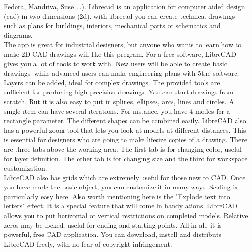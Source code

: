 Fedora,  Mandriva,  Suse  ...).  Librecad  is  an  application  for  computer  aided  design  (cad)  in  two
dimensions  (2d).  with  librecad   you   can  create  technical  drawings  such  as  plans  for  buildings,  interiors,
mechanical parts or schematics and diagrams.\\
The  app  is  great  for  industrial  designers,  but  anyone  who  wants  to  learn  how  to  make  2D  CAD
drawings  will  like  this  program.  For  a  free  software,  LibreCAD  gives  you  a  lot  of  tools  to  work  with.
New  users  will  be  able  to  create  basic drawings, while advanced users can make engineering plans with
5the  software.  Layers  can  be  added,  ideal  for  complex   drawings.  The  provided  tools  are  sufficient  for
producing  high  precision  drawings.  You  can  start  drawings  from  scratch.  But  it  is  also  easy  to  put  in
splines,  ellipses,  arcs,  lines  and   circles.  A  single  item  can  have  several iterations. For instance, you have
4 modes for a rectangle parameter. The different shapes can be combined easily.
LibreCAD  also  has  a  powerful  zoom  tool  that  lets  you  look  at  models  at  different  distances.  This  is
essential  for  designers  who  are  going  to  make  life­size  copies  of  a  drawing.  There are three tabs above
the  working  area.   The  first  tab  is  for  changing  color,  useful  for  layer  definition.   The  other  tab  is  for
changing size and the third for workspace customization.\\
  LibreCAD also has grids which are extremely useful for those new to CAD. Once you have  made the
basic  object,  you can customize it in many ways. Scaling is particularly easy here. Also worth mentioning
here  is  the  "Explode  text  into  letters"  effect.   It  is  a  special  feature  that  will come in handy ations.
LibreCAD  allows  you  to  put  horizontal  or vertical restrictions on completed models. Relative zeros may
be  locked,  useful  for   ending  and  starting  points.  All  in  all,  it is powerful, free CAD application. You can
download, install and distribute LibreCAD freely, with no fear of copyright infringement.